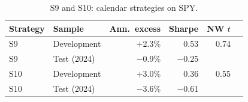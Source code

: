 \documentclass[../main.tex]{subfiles}
\begin{document}
\begin{table}[tbp]
\centering\small
\caption{S9 and S10: calendar strategies on SPY.}\label{tab:s9}
\begin{tabular}{@{}llrrrr@{}}
\toprule
Strategy & Sample & Ann.\ excess & Sharpe & NW $t$ & \\
\midrule
S9 & Development & $+$2.3\% & 0.53 & 0.74 & \\
S9 & Test (2024) & $-$0.9\% & $-$0.25 & & \\
S10 & Development & $+$3.0\% & 0.36 & 0.55 & \\
S10 & Test (2024) & $-$3.6\% & $-$0.61 & & \\
\bottomrule
\end{tabular}
\end{table}
\end{document}
